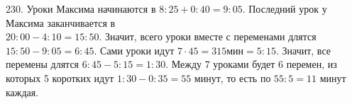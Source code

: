 230. Уроки Максима начинаются в $8:25+0:40=9:05.$ Последний урок у Максима заканчивается в \\ $20:00-4:10=15:50.$ Значит, всего уроки вместе с переменами длятся $15:50-9:05=6:45.$ Сами уроки идут $7\cdot45=315\text{мин}=5:15.$ Значит, все перемены длятся $6:45-5:15=1:30.$ Между 7 уроками будет 6 перемен, из которых 5 коротких идут $1:30-0:35=55$ минут, то есть по $55:5=11$ минут каждая.\\
